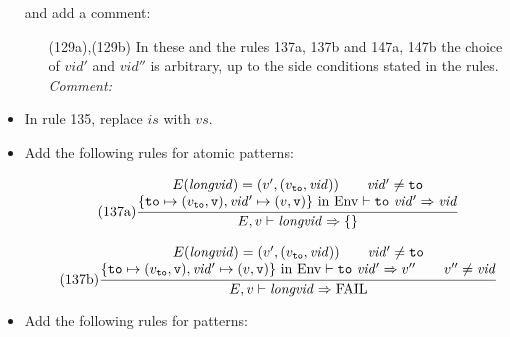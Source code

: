 \documentclass[twoside,titlepage]{article}
\begin{document}
\begin{appendix}
\begin{itemize}
  and add a comment:
  \begin{itemize}
  \item[(129a),(129b)] In these and the rules 137a, 137b and 147a, 147b the choice of $\mathit{vid}'$ and $\mathit{vid}''$ is arbitrary, up to the side conditions stated in the rules.
  \emph{Comment:}
  \end{itemize}

\item In rule 135, replace $\mathit{is}$ with $\mathit{vs}$.

\item Add the following rules for atomic patterns:

  \begin{equation}
  \tag{137a}
  \frac{
  \begin{array}{@{}c@{}}
  E(\mathit{longvid}) = (v', (v_{\tt{to}},\mathit{vid}))
  \qquad
  \mathit{vid'} \neq {\tt{to}}
  \\
  \mbox{$\{{\tt{to}}\mapsto(v_{\tt{to}},{\tt{v}}), \mathit{vid'}\mapsto(v,{\tt{v}})\}$ in Env} \vdash {\tt{to}}~\mathit{vid'} \Rightarrow \mathit{vid}
  \end{array}
  }{
  E,v \vdash \mathit{longvid} \Rightarrow \{\}
  }
  \end{equation}


  \begin{equation}
  \tag{137b}
  \frac{
  \begin{array}{@{}c@{}}
  E(\mathit{longvid}) = (v', (v_{\tt{to}},\mathit{vid}))
  \qquad
  \mathit{vid'} \neq {\tt{to}}
  \\
  \mbox{$\{{\tt{to}}\mapsto(v_{\tt{to}},{\tt{v}}), \mathit{vid'}\mapsto(v,{\tt{v}})\}$ in Env} \vdash {\tt{to}}~\mathit{vid'} \Rightarrow v''
  \qquad
  v'' \neq \mathit{vid}
  \end{array}
  }{
  E,v \vdash \mathit{longvid} \Rightarrow \mbox{FAIL}
  }
  \end{equation}

\item Add the following rules for patterns:


\end{itemize}
\end{appendix}
\end{document}
